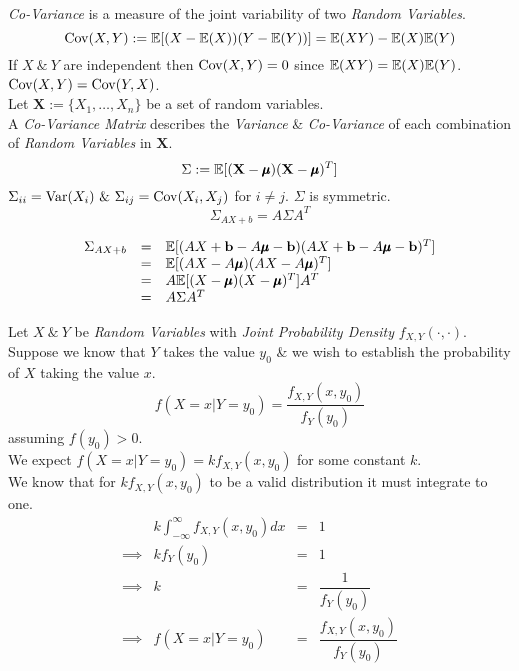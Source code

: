 \documentclass[11pt,a4paper]{article}
\begin{document}
\textit{Co-Variance} is a measure of the joint variability of two \textit{Random Variables}.
$$\mathrm{Cov}(X,Y):=\mathbb{E}[(X-\mathbb{E}(X))(Y-\mathbb{E}(Y))]=\mathbb{E}(XY)-\mathbb{E}(X)\mathbb{E}(Y)$$
\nb If $X\ \&\ Y$ are independent then $\mathrm{Cov}(X,Y)=0$ since $\mathbb{E}(XY)=\mathbb{E}(X)\mathbb{E}(Y)$.\\
\nb $\mathrm{Cov}(X,Y)=\mathrm{Cov}(Y,X)$.\\

Let $\textbf{X}:=\{X_1,\dots,X_n\}$ be a set of random variables.\\
A \textit{Co-Variance Matrix} describes the \textit{Variance} \& \textit{Co-Variance} of each combination of \textit{Random Variables} in $\textbf{X}$.\\
$$\Sigma:=\mathbb{E}[(\textbf{X}-\pmb\mu)(\textbf{X}-\pmb\mu)^T]$$
\nb $\Sigma_{ii}=\var(X_i)\ \&\ \Sigma_{ij}=\cov(X_i,X_j)$ for $i\neq j$. $\Sigma$ is symmetric.\\

$$\Sigma_{AX+b}=A\Sigma A^T$$

\[\begin{array}{rcl}
\Sigma_{AX+b}&=&\mathbb{E}[(AX+\textbf{b}-A\pmb\mu-\textbf{b})(AX+\textbf{b}-A\pmb\mu-\textbf{b})^T]\\
&=&\mathbb{E}[(AX-A\pmb\mu)(AX-A\pmb\mu)^T]\\
&=&A\mathbb{E}[(X-\pmb\mu)(X-\pmb\mu)^T]A^T\\
&=&A\Sigma A^T
\end{array}\]

Let $X\ \&\ Y$ be \textit{Random Variables} with \textit{Joint Probability Density} $f_{X,Y}(\cdot,\cdot)$.\\
Suppose we know that $Y$ takes the value $y_0$ \& we wish to establish the probability of $X$ taking the value $x$.
$$f(X=x|Y=y_0)=\dfrac{f_{X,Y}(x,y_0)}{f_Y(y_0)}$$
assuming $f(y_0)>0$.\\

We expect $f(X=x|Y=y_0)=kf_{X,Y}(x,y_0)$ for some constant $k$.\\
We know that for $kf_{X,Y}(x,y_0)$ to be a valid distribution it must integrate to one.
\[\begin{array}{rrcl}
&k\displaystyle\int_{-\infty}^\infty f_{X,Y}(x,y_0)dx&=&1\\
\implies&kf_Y(y_0)&=&1\\
\implies&k&=&\dfrac{1}{f_Y(y_0)}\\
\implies&f(X=x|Y=y_0)&=&\dfrac{f_{X,Y}(x,y_0)}{f_Y(y_0)}
\end{array}\]
\end{document}
